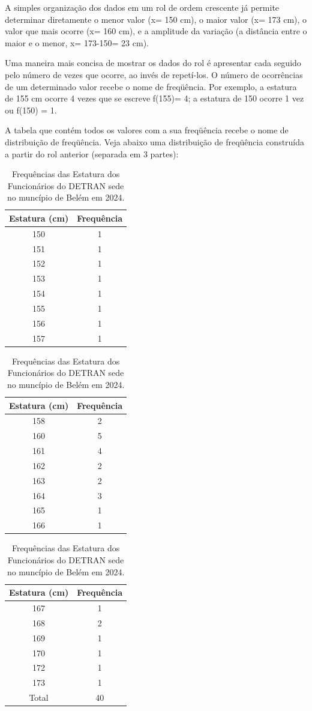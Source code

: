 \newpage
A simples organização dos dados em um rol de ordem crescente já permite determinar diretamente o menor valor (x= 150 cm), o maior valor (x= 173 cm), o valor que mais ocorre (x= 160 cm), e a amplitude da variação (a distância entre o maior e o menor, x= 173-150= 23 cm).\vskip0.3cm


Uma maneira mais concisa de mostrar os dados do rol é apresentar cada seguido pelo número de vezes que ocorre, ao invés de repetí-los. O número de ocorrências de um determinado valor recebe o nome de freqüência. Por exemplo, a estatura de 155 cm ocorre 4 vezes que se escreve f(155)= 4; a estatura de 150 ocorre 1 vez ou f(150) = 1.\vskip0.3cm


A tabela que contém todos os valores com a sua freqüência recebe o nome de distribuição de freqüência. Veja abaixo uma distribuição de freqüência construída a partir do rol anterior (separada em 3 partes):

\begin{center}
\begin{table}[!htb]
    \centering
    {
    \caption{Frequências das Estatura dos Funcionários do DETRAN sede no muncípio de Belém em 2024.}
    \label{estatura2}
    \vspace{0.2cm}
\begin{tabular}{c|c}
\hline\hline
Estatura (cm) & Frequência \\
  \hline\hline
  150 & 1  \\
  151 & 1 \\
  152 & 1  \\
  153 & 1  \\
  154 & 1  \\
  155 & 1  \\
  156 & 1  \\
  157 & 1  \\
  \hline\hline
\end{tabular}}
\begin{tabular}{c|c}
\hline\hline 
Estatura (cm) & Frequência \\
  \hline\hline
  158 & 2  \\
  160 & 5 \\
  161 & 4  \\
  162 & 2  \\
  163 & 2  \\
  164 & 3  \\
  165 & 1  \\
  166 & 1  \\
  \hline\hline
\end{tabular}
\begin{tabular}{c|c}
\hline
Estatura (cm) & Frequência \\
  \hline\hline
  167 & 1  \\
  168 & 2 \\
  169 & 1  \\
  170 & 1 \\
  172 & 1 \\
  173 & 1 \\
  \hline\hline
  Total & 40 \\
  \hline\hline
\end{tabular}
\end{table}
\end{center}

